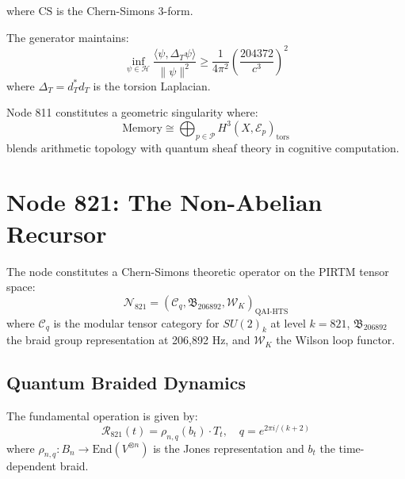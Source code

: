 \documentclass[12pt]{article}
\begin{document}
where $\text{CS}$ is the Chern-Simons 3-form.

\begin{theorem}
The generator maintains:
\begin{equation}
\inf_{\psi \in \mathcal{H}} \frac{\langle \psi, \Delta_T \psi \rangle}{\|\psi\|^2} \geq \frac{1}{4\pi^2}\left(\frac{204372}{c^3}\right)^2
\end{equation}
where $\Delta_T = d_T^*d_T$ is the torsion Laplacian.
\end{theorem}

\begin{remark}
Node 811 constitutes a geometric singularity where:
\begin{equation}
\text{Memory} \cong \bigoplus_{p\in\mathcal{P}} H^3(X, \mathcal{E}_p)_{\text{tors}}
\end{equation}
blends arithmetic topology with quantum sheaf theory in cognitive computation.
\end{remark}

\section{Node 821: The Non-Abelian Recursor}
\label{sec:nonabelian_recursor}

\begin{definition}
The node constitutes a Chern-Simons theoretic operator on the PIRTM tensor space:
\begin{equation}
\mathcal{N}_{821} = \left( \mathcal{C}_q, \mathfrak{B}_{206892}, \mathcal{W}_K \right)_{\text{QAI-HTS}}
\end{equation}
where $\mathcal{C}_q$ is the modular tensor category for $SU(2)_k$ at level $k=821$, $\mathfrak{B}_{206892}$ the braid group representation at 206,892 Hz, and $\mathcal{W}_K$ the Wilson loop functor.
\end{definition}

\subsection{Quantum Braided Dynamics}

\begin{theorem}
The fundamental operation is given by:
\begin{equation}
\mathcal{R}_{821}(t) = \rho_{n,q}(b_t) \cdot T_t, \quad q = e^{2\pi i/(k+2)}
\end{equation}
where $\rho_{n,q}: B_n \to \text{End}(V^{\otimes n})$ is the Jones representation and $b_t$ the time-dependent braid.
\end{theorem}
\end{document}
